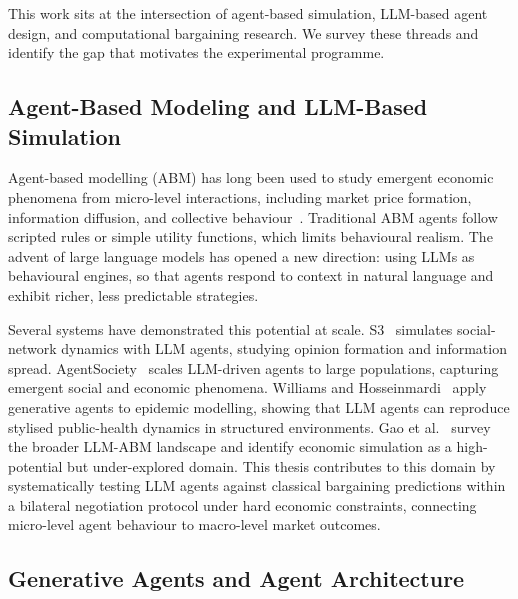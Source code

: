 \label{sec:related}

This work sits at the intersection of agent-based simulation, LLM-based agent design, and computational bargaining research.  We survey these threads and identify the gap that motivates the experimental programme.

\subsection{Agent-Based Modeling and LLM-Based Simulation}
\label{sec:rw_abm}

Agent-based modelling (ABM) has long been used to study emergent economic phenomena from micro-level interactions, including market price formation, information diffusion, and collective behaviour~\cite{gao2023largelanguagemodelsempowered}.  Traditional ABM agents follow scripted rules or simple utility functions, which limits behavioural realism.  The advent of large language models has opened a new direction: using LLMs as behavioural engines, so that agents respond to context in natural language and exhibit richer, less predictable strategies.

Several systems have demonstrated this potential at scale.  S3~\cite{gao2023s3} simulates social-network dynamics with LLM agents, studying opinion formation and information spread.  AgentSociety~\cite{pang2025agentsociety} scales LLM-driven agents to large populations, capturing emergent social and economic phenomena.  Williams and Hosseinmardi~\cite{williams2023epidemic} apply generative agents to epidemic modelling, showing that LLM agents can reproduce stylised public-health dynamics in structured environments.  Gao et al.~\cite{gao2023largelanguagemodelsempowered} survey the broader LLM-ABM landscape and identify economic simulation as a high-potential but under-explored domain.  This thesis contributes to this domain by systematically testing LLM agents against classical bargaining predictions within a bilateral negotiation protocol under hard economic constraints, connecting micro-level agent behaviour to macro-level market outcomes.

\subsection{Generative Agents and Agent Architecture}
\label{sec:rw_agents}

